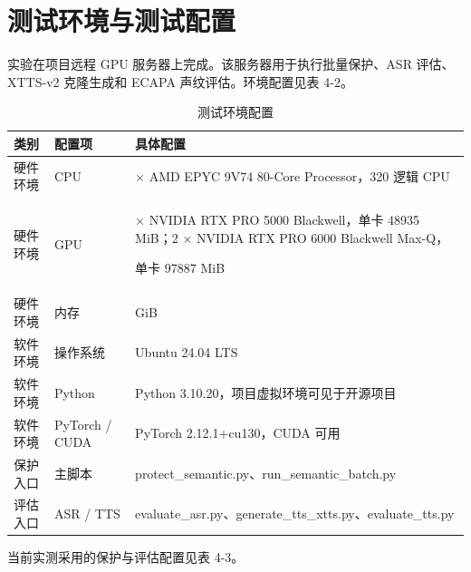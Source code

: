 \section{测试环境与测试配置}\label{ux6d4bux8bd5ux73afux5883ux4e0eux6d4bux8bd5ux914dux7f6e}

实验在项目远程 GPU 服务器上完成。该服务器用于执行批量保护、ASR
评估、XTTS-v2 克隆生成和 ECAPA 声纹评估。环境配置见表 4-2。

{\def\LTcaptype{table} %
\begin{longtable}[]{@{}
  >{\centering\arraybackslash}m{}
  >{\centering\arraybackslash}m{}
  >{\centering\arraybackslash}m{}@{}}
\caption{测试环境配置}\\
\toprule\noalign{}
\begin{minipage}[b]{\linewidth}\centering
\textbf{类别}
\end{minipage} & \begin{minipage}[b]{\linewidth}\centering
\textbf{配置项}
\end{minipage} & \begin{minipage}[b]{\linewidth}\centering
\textbf{具体配置}
\end{minipage} \\
\midrule\noalign{}
\endhead
\bottomrule\noalign{}
\endlastfoot
硬件环境 & CPU & 2 × AMD EPYC 9V74 80-Core Processor，320 逻辑 CPU \\
硬件环境 & GPU & 4 × NVIDIA RTX PRO 5000 Blackwell，单卡 48935 MiB；2 ×
NVIDIA RTX PRO 6000 Blackwell Max-Q，

单卡 97887 MiB \\
硬件环境 & 内存 & 251 GiB \\
软件环境 & 操作系统 & Ubuntu 24.04 LTS \\
软件环境 & Python & Python 3.10.20，项目虚拟环境可见于开源项目 \\
软件环境 & PyTorch / CUDA & PyTorch 2.12.1+cu130，CUDA 可用 \\
保护入口 & 主脚本 & protect\_semantic.py、run\_semantic\_batch.py \\
评估入口 & ASR / TTS &
evaluate\_asr.py、generate\_tts\_xtts.py、evaluate\_tts.py \\
\end{longtable}
}

当前实测采用的保护与评估配置见表 4-3。

